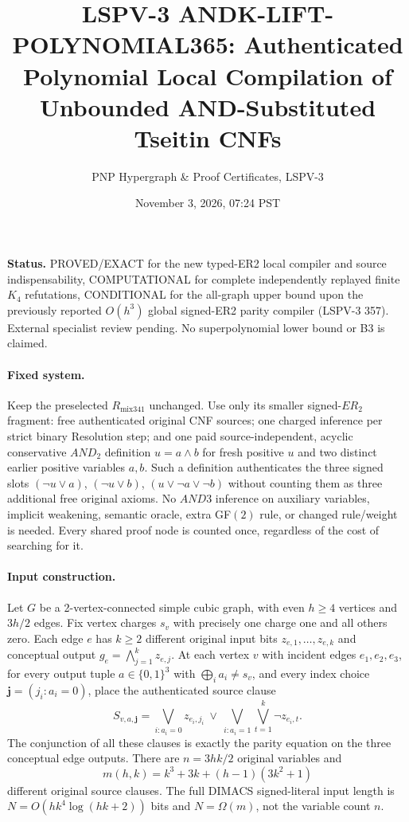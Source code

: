 \documentclass[11pt]{article}
\title{LSPV-3 ANDK-LIFT-POLYNOMIAL365: Authenticated Polynomial Local Compilation of Unbounded AND-Substituted Tseitin CNFs}
\author{PNP Hypergraph \& Proof Certificates, LSPV-3}
\date{November 3, 2026, 07:24 PST}
\begin{document}
\maketitle
\noindent\textbf{Status.} PROVED/EXACT for the new typed-ER2 local compiler and source indispensability, COMPUTATIONAL for complete independently replayed finite $K_4$ refutations, CONDITIONAL for the all-graph upper bound upon the previously reported $O(h^3)$ global signed-ER2 parity compiler (LSPV-3 357). External specialist review pending. No superpolynomial lower bound or B3 is claimed.

\paragraph{Fixed system.}
Keep the preselected $R_{\mathrm{mix341}}$ unchanged. Use only its smaller signed-$ER_2$ fragment: free authenticated original CNF sources; one charged inference per strict binary Resolution step; and one paid source-independent, acyclic conservative $AND_2$ definition $u=a\wedge b$ for fresh positive $u$ and two distinct earlier positive variables $a,b$. Such a definition authenticates the three signed slots $(\neg u\vee a)$, $(\neg u\vee b)$, $(u\vee\neg a\vee\neg b)$ without counting them as three additional free original axioms. No $AND3$ inference on auxiliary variables, implicit weakening, semantic oracle, extra GF$(2)$ rule, or changed rule/weight is needed. Every shared proof node is counted once, regardless of the cost of searching for it.

\paragraph{Input construction.}
Let $G$ be a 2-vertex-connected simple cubic graph, with even $h\ge4$ vertices and $3h/2$ edges. Fix vertex charges $s_v$ with precisely one charge one and all others zero. Each edge $e$ has $k\ge2$ different original input bits $z_{e,1},\ldots,z_{e,k}$ and conceptual output $g_e=\bigwedge_{j=1}^k z_{e,j}$. At each vertex $v$ with incident edges $e_1,e_2,e_3$, for every output tuple $a\in\{0,1\}^3$ with $\bigoplus_i a_i\ne s_v$, and every index choice $\mathbf j=(j_i:a_i=0)$, place the authenticated source clause
\[
S_{v,a,\mathbf j}=
\bigvee_{i:a_i=0}z_{e_i,j_i}
\ \vee\
\bigvee_{i:a_i=1}\bigvee_{t=1}^k \neg z_{e_i,t}.
\tag{1}
\]
The conjunction of all these clauses is exactly the parity equation on the three conceptual edge outputs. There are $n=3hk/2$ original variables and
\[
m(h,k)=k^3+3k+(h-1)(3k^2+1)
\tag{2}
\]
different original source clauses. The full DIMACS signed-literal input length is $N=O(hk^4\log(hk+2))$ bits and $N=\Omega(m)$, not the variable count $n$.
\end{document}
